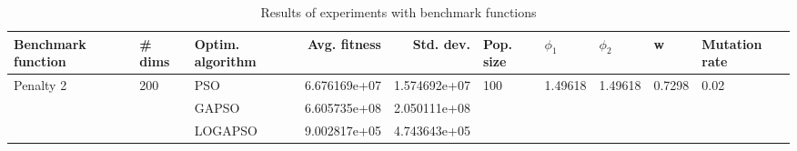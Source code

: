 \begin{table}
\centering
\caption{Results of experiments with benchmark functions}
\begin{tabular}{lllrrlllll}
\toprule
        Benchmark function &              \# dims & Optim. algorithm &  Avg. fitness &    Std. dev. &            Pop. size &               $\phi_{1}$ &               $\phi_{2}$ &                       w &         Mutation rate \\
\midrule
\multirow{3}{*}{Penalty 2} & \multirow{3}{*}{200} &              PSO &  6.676169e+07 & 1.574692e+07 & \multirow{3}{*}{100} & \multirow{3}{*}{1.49618} & \multirow{3}{*}{1.49618} & \multirow{3}{*}{0.7298} & \multirow{3}{*}{0.02} \\
                           &                      &            GAPSO &  6.605735e+08 & 2.050111e+08 &                      &                          &                          &                         &                       \\
                           &                      &          LOGAPSO &  9.002817e+05 & 4.743643e+05 &                      &                          &                          &                         &                       \\
\bottomrule
\end{tabular}
\end{table}
